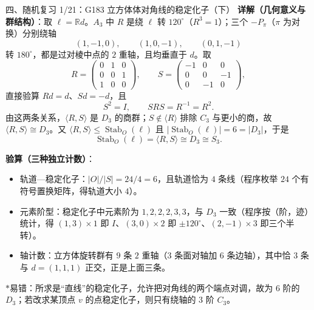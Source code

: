\documentclass[aspectratio=169,10pt,fontset=none]{ctexbeamer}
\newcommand{\key}[1]{\textcolor{ink}{\bfseries #1}}
\newcommand{\starpt}{\textcolor{accent}{\bfseries$\ast$}}
\begin{document}
\begin{frame}[t]{四、随机复习 1/21：G183 立方体体对角线的稳定化子（下）}
\scriptsize
\key{详解（几何意义与群结构）}：取 $\ell=\mathbb R d$。$A_3$ 中 $R$ 是绕 $\ell$ 转 $120^\circ$（$R^3=1$）；三个 $-P_\pi$（$\pi$ 为对换）分别绕轴
\[ (1,-1,0),\qquad (1,0,-1),\qquad (0,1,-1) \]
转 $180^\circ$，都是过对棱中点的 $2$ 重轴，且均垂直于 $d$。取
\[ R=\begin{pmatrix}0&1&0\\0&0&1\\1&0&0\end{pmatrix},\qquad S=\begin{pmatrix}-1&0&0\\0&0&-1\\0&-1&0\end{pmatrix}, \]
直接验算 $Rd=d$、$Sd=-d$，且
\[ S^2=I,\qquad SRS=R^{-1}=R^2. \]
由这两条关系，$\langle R,S\rangle$ 是 $D_3$ 的商群；$S\notin\langle R\rangle$ 排除 $C_3$ 与更小的商，故 $\langle R,S\rangle\cong D_3$。又 $\langle R,S\rangle\le\operatorname{Stab}_O(\ell)$ 且 $|\operatorname{Stab}_O(\ell)|=6=|D_3|$，于是
\[ \operatorname{Stab}_O(\ell)=\langle R,S\rangle\cong D_3\cong S_3. \]

\key{验算（三种独立计数）}：
\begin{itemize}
\item 轨道—稳定化子：$|O|/|S|=24/4=6$，且轨道恰为 $4$ 条线（程序枚举 $24$ 个有符号置换矩阵，得轨道大小 $4$）。
\item 元素阶型：稳定化子中元素阶为 $1,2,2,2,3,3$，与 $D_3$ 一致（程序按（阶，迹）统计，得 $(1,3)\times1$ 即 $I$、$(3,0)\times2$ 即 $\pm120^\circ$、$(2,-1)\times3$ 即三个半转）。
\item 轴计数：立方体旋转群有 $9$ 条 $2$ 重轴（$3$ 条面对轴加 $6$ 条边轴），其中恰 $3$ 条与 $d=(1,1,1)$ 正交，正是上面三条。
\end{itemize}
\starpt 易错：所求是“直线”的稳定化子，允许把对角线的两个端点对调，故为 $6$ 阶的 $D_3$；若改求某顶点 $v$ 的点稳定化子，则只有绕轴的 $3$ 阶 $C_3$。
\end{frame}
\end{document}
